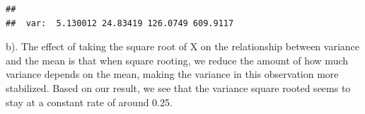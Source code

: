 \documentclass[
]{article}
\begin{document}
\begin{verbatim}
## 
##  var:  5.130012 24.83419 126.0749 609.9117
\end{verbatim}

b). The effect of taking the square root of X on the relationship
between variance and the mean is that when square rooting, we reduce the
amount of how much variance depends on the mean, making the variance in
this observation more stabilized. Based on our result, we see that the
variance square rooted seems to stay at a constant rate of around 0.25.
\end{document}

